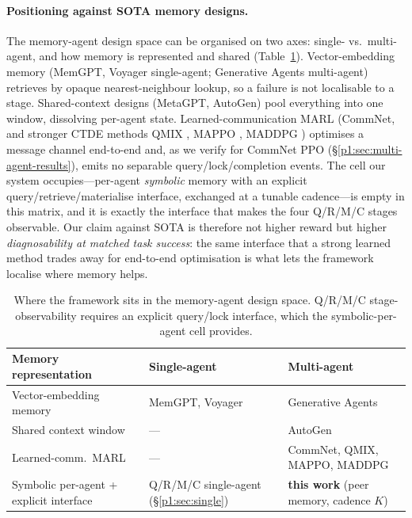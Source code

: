 \documentclass{article}
\begin{document}
\paragraph{Positioning against SOTA memory designs.}
The memory-agent design space can be organised on two axes: single- vs.\ multi-agent, and how memory is represented and shared (Table~\ref{p1:tab:sota-quadrants}). Vector-embedding memory (MemGPT, Voyager single-agent; Generative Agents multi-agent) retrieves by opaque nearest-neighbour lookup, so a failure is not localisable to a stage. Shared-context designs (MetaGPT, AutoGen) pool everything into one window, dissolving per-agent state. Learned-communication MARL (CommNet, and stronger CTDE methods QMIX \citep{rashid2018qmix}, MAPPO \citep{yu2022mappo}, MADDPG \citep{lowe2017maddpg}) optimises a message channel end-to-end and, as we verify for CommNet PPO (\S\ref{p1:sec:multi-agent-results}), emits no separable query/lock/completion events. The cell our system occupies---per-agent \emph{symbolic} memory with an explicit query/retrieve/materialise interface, exchanged at a tunable cadence---is empty in this matrix, and it is exactly the interface that makes the four Q/R/M/C stages observable. Our claim against SOTA is therefore not higher reward but higher \emph{diagnosability at matched task success}: the same interface that a strong learned method trades away for end-to-end optimisation is what lets the framework localise where memory helps.

\begin{table}[h]
\caption{Where the framework sits in the memory-agent design space. Q/R/M/C stage-observability requires an explicit query/lock interface, which the symbolic-per-agent cell provides.}
\label{p1:tab:sota-quadrants}
\centering
\small
\begin{tabular}{p{3.1cm} p{4.3cm} p{4.3cm}}
\toprule
Memory representation & Single-agent & Multi-agent \\
\midrule
Vector-embedding memory & MemGPT, Voyager \citep{packer2023memgpt,wang2023voyager} & Generative Agents \citep{park2023generative} \\
Shared context window & --- & AutoGen \citep{wu2023autogen} \\
Learned-comm.\ MARL & --- & CommNet, QMIX, MAPPO, MADDPG \citep{sukhbaatar2016commnet,rashid2018qmix,yu2022mappo,lowe2017maddpg} \\
Symbolic per-agent + explicit interface & Q/R/M/C single-agent (\S\ref{p1:sec:single}) & \textbf{this work} (peer memory, cadence $K$) \\
\bottomrule
\end{tabular}
\end{table}
\end{document}
